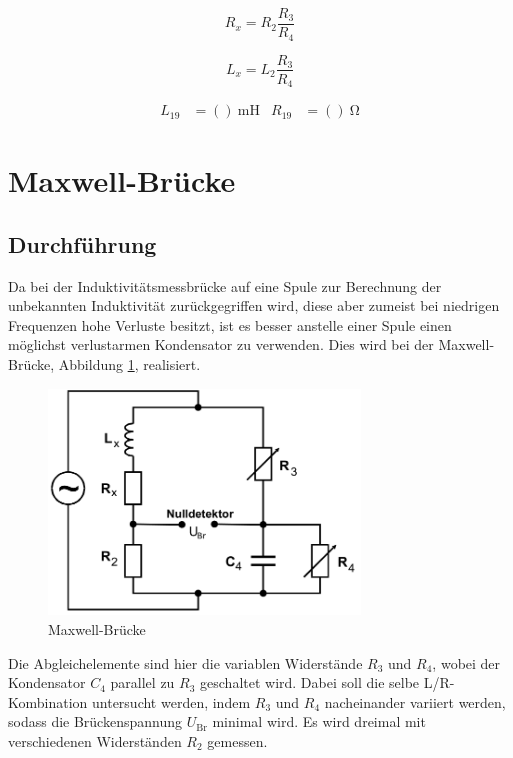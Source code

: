 \begin{equation}
  R_x = R_2 \frac{R_3}{R_4}
\end{equation}

\begin{equation}
  L_x = L_2 \frac{R_3}{R_4}
\end{equation}

\begin{align}
  L_{19}   &= ()\:\si{\milli\henry} & R_{19} &= ()\:\si{\ohm}
\end{align}

\section{Maxwell-Brücke}
\subsection{Durchführung}
Da bei der Induktivitätsmessbrücke auf eine Spule zur Berechnung der unbekannten Induktivität zurückgegriffen wird, diese aber zumeist bei niedrigen Frequenzen hohe Verluste besitzt, ist es besser anstelle einer Spule einen möglichst verlustarmen Kondensator zu verwenden.
Dies wird bei der Maxwell-Brücke, Abbildung \ref{fig:4}, realisiert.
\begin{figure}[H]
  \centering
  \includegraphics[height=6cm]{max.png}
  \caption{Maxwell-Brücke \cite{sample}}
  \label{fig:4}
\end{figure}
Die Abgleichelemente sind hier die variablen Widerstände $R_3$ und $R_4$, wobei der Kondensator $C_4$ parallel zu $R_3$ geschaltet wird.
Dabei soll die selbe L/R-Kombination untersucht werden, indem $R_3$ und $R_4$ nacheinander variiert werden, sodass die Brückenspannung $U_{\text{Br}}$ minimal wird.
Es wird dreimal mit verschiedenen Widerständen $R_2$ gemessen.
